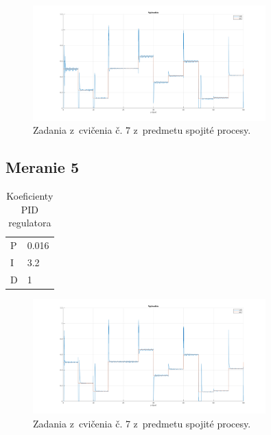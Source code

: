 \documentclass{article}
\begin{document}
\begin{figure}[!htbp]
	\begin{center}
		\includegraphics[width=0.8\textwidth]{./include/m4.png}
	\end{center}
	\caption{Zadania z~cvičenia č. 7 z~predmetu spojité procesy.}
	\label{fig:meranie4}
\end{figure}


\subsection{Meranie 5}
\label{sec:meranie5}

\begin{table}[!htbp]
	\caption{Koeficienty PID regulatora}
	\label{tab:t5}
	\begin{center}
		\begin{tabular}[c]{|l|l|}
			\hline
			P & 0.016 \\
			I & 3.2 \\
			D & 1 \\
			\hline
		\end{tabular}
	\end{center}
\end{table}

\begin{figure}[!htbp]
	\begin{center}
		\includegraphics[width=0.8\textwidth]{./include/m5.png}
	\end{center}
	\caption{Zadania z~cvičenia č. 7 z~predmetu spojité procesy.}
	\label{fig:meranie5}
\end{figure}
\end{document}
